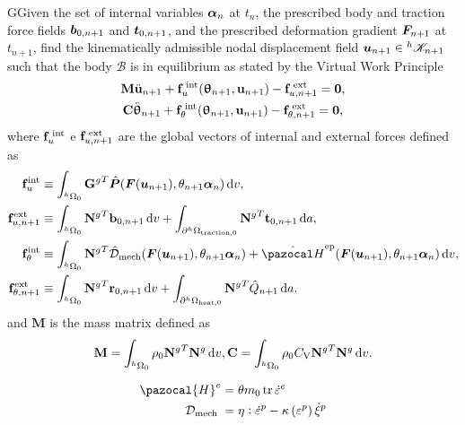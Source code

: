 \begin{problem}
GGiven the set of internal variables $\bm{\alpha}_n$ at $t_n$, the prescribed body and traction force fields $\bm{b}_{0,n+1}$ and $\bm{t}_{0,n+1}$, and the prescribed deformation gradient $\bm{F}_{n+1}$ at $t_{n+1}$, find the kinematically admissible nodal displacement field $\bm{u}_{n+1}\in {^h\mathscr{K}_{n+1}}$ such that the body $\mathscr{B}$ is in equilibrium as stated by the Virtual Work Principle
\begin{gather}
    \mathbf M \ddot{\mathbf u}_{n+1} +\mathbf f_u^\text{\;int}(\bm \uptheta_{n+1}, \mathbf u_{n+1})-\mathbf f^\text{\;ext}_{u,n+1}=\mathbf 0, \\
    \mathbf C \ddot{\bm \uptheta}_{n+1} +\mathbf f_\theta^\text{\;int}(\bm \uptheta_{n+1}, \mathbf u_{n+1})-\mathbf f^\text{\;ext}_{\theta,n+1}=\mathbf 0,
\end{gather}
where $\mathbf f_u^\text{\;int}$ e $\mathbf f^\text{\;ext}_{u,n+1}$ are the global vectors of internal and external forces defined as
\begin{align}
    \mathbf f_u^\text{int} &\equiv \int_{^h\Omega_0}{\mathbf G^g}^T \hat{\mat P}(\mat F(\bm u_{n+1}), \theta_{n+1} \vect \alpha_n)\ud v,\\
    \mathbf f^\text{ext}_{u,n+1} &\equiv \int_{^h\Omega_0}{\mathbf N^g}^T \mathbf b_{0,n+1}\ud v + \int_{\partial^h\Omega_\text{traction,0}}{\mathbf N^g}^T \mathbf t_{0,n+1}\ud a,\\
    \mathbf f_\theta^\text{int} &\equiv \int_{^h\Omega_0}{\mathbf N^g}^T \hat{\mathcal D}_\text{mech}(\mat F(\bm u_{n+1}), \theta_{n+1} \vect \alpha_n) +\hat{\pazocal H}^\text{ep}(\mat F(\bm u_{n+1}), \theta_{n+1} \vect \alpha_n) \ud v,\\
    \mathbf f^\text{ext}_{\theta,n+1} &\equiv \int_{^h\Omega_0}{\mathbf N^g}^T \mathbf r_{0,n+1}\ud v + \int_{\partial^h\Omega_\text{heat,0}}{\mathbf N^g}^T \hat Q_{n+1}\ud a.
\end{align}
and $\mathbf M$ is the mass matrix defined as
\begin{equation}
  \mathbf M = \int_{{}^h\Omega_0} \rho_0 {\mathbf{N}^g}^T\mathbf{N}^g \,\mathrm{d} v,\\
  \mathbf C = \int_{{}^h\Omega_0} \rho_0C_\mathrm{V} {\mathbf{N}^g}^T\mathbf{N}^g \,\mathrm{d} v.
\end{equation}
\end{problem}

\begin{equation}
\begin{aligned}
\pazocal{H}^{e} &=\theta m_{0} \operatorname{tr} \dot{\varepsilon}^{e} \\
\mathcal{D}_{\text {mech }} &=\eta: \dot{\varepsilon}^{p}-\kappa\left(\varepsilon^{p}\right) \dot{\xi}^{p}
\end{aligned}
\end{equation}


